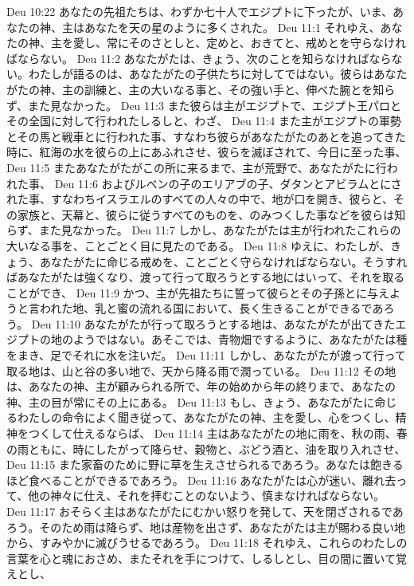 Deu 10:22  あなたの先祖たちは、わずか七十人でエジプトに下ったが、いま、あなたの神、主はあなたを天の星のように多くされた。
Deu 11:1  それゆえ、あなたの神、主を愛し、常にそのさとしと、定めと、おきてと、戒めとを守らなければならない。
Deu 11:2  あなたがたは、きょう、次のことを知らなければならない。わたしが語るのは、あなたがたの子供たちに対してではない。彼らはあなたがたの神、主の訓練と、主の大いなる事と、その強い手と、伸べた腕とを知らず、また見なかった。
Deu 11:3  また彼らは主がエジプトで、エジプト王パロとその全国に対して行われたしるしと、わざ、
Deu 11:4  また主がエジプトの軍勢とその馬と戦車とに行われた事、すなわち彼らがあなたがたのあとを追ってきた時に、紅海の水を彼らの上にあふれさせ、彼らを滅ぼされて、今日に至った事、
Deu 11:5  またあなたがたがこの所に来るまで、主が荒野で、あなたがたに行われた事、
Deu 11:6  およびルベンの子のエリアブの子、ダタンとアビラムとにされた事、すなわちイスラエルのすべての人々の中で、地が口を開き、彼らと、その家族と、天幕と、彼らに従うすべてのものを、のみつくした事などを彼らは知らず、また見なかった。
Deu 11:7  しかし、あなたがたは主が行われたこれらの大いなる事を、ことごとく目に見たのである。
Deu 11:8  ゆえに、わたしが、きょう、あなたがたに命じる戒めを、ことごとく守らなければならない。そうすればあなたがたは強くなり、渡って行って取ろうとする地にはいって、それを取ることができ、
Deu 11:9  かつ、主が先祖たちに誓って彼らとその子孫とに与えようと言われた地、乳と蜜の流れる国において、長く生きることができるであろう。
Deu 11:10  あなたがたが行って取ろうとする地は、あなたがたが出てきたエジプトの地のようではない。あそこでは、青物畑でするように、あなたがたは種をまき、足でそれに水を注いだ。
Deu 11:11  しかし、あなたがたが渡って行って取る地は、山と谷の多い地で、天から降る雨で潤っている。
Deu 11:12  その地は、あなたの神、主が顧みられる所で、年の始めから年の終りまで、あなたの神、主の目が常にその上にある。
Deu 11:13  もし、きょう、あなたがたに命じるわたしの命令によく聞き従って、あなたがたの神、主を愛し、心をつくし、精神をつくして仕えるならば、
Deu 11:14  主はあなたがたの地に雨を、秋の雨、春の雨ともに、時にしたがって降らせ、穀物と、ぶどう酒と、油を取り入れさせ、
Deu 11:15  また家畜のために野に草を生えさせられるであろう。あなたは飽きるほど食べることができるであろう。
Deu 11:16  あなたがたは心が迷い、離れ去って、他の神々に仕え、それを拝むことのないよう、慎まなければならない。
Deu 11:17  おそらく主はあなたがたにむかい怒りを発して、天を閉ざされるであろう。そのため雨は降らず、地は産物を出さず、あなたがたは主が賜わる良い地から、すみやかに滅びうせるであろう。
Deu 11:18  それゆえ、これらのわたしの言葉を心と魂におさめ、またそれを手につけて、しるしとし、目の間に置いて覚えとし、

